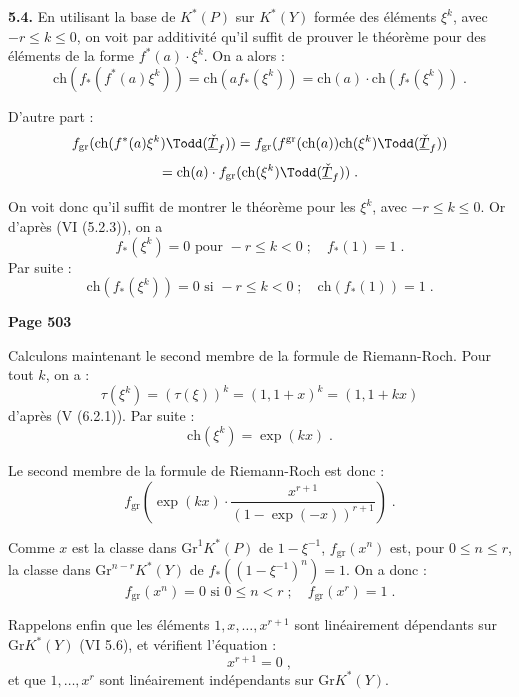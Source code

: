 \medskip
\noindent\textbf{5.4.} En utilisant la base de $K^*(P)$ sur $K^*(Y)$ form\'ee des \'el\'ements $\xi^k$, avec $-r \leq k \leq 0$, on voit par additivit\'e qu'il suffit de prouver le th\'eor\`eme pour des \'el\'ements de la forme $f^*(a) \cdot \xi^k$. On a alors :
\[
\mathrm{ch}(f_*(f^*(a)\xi^k)) = \mathrm{ch}(af_*(\xi^k)) = \mathrm{ch}(a) \cdot \mathrm{ch}(f_*(\xi^k))\;.
\]

D'autre part :
\[
f_{\mathrm{gr}}(\mathrm{ch}(f^*(a)\xi^k)\Todd(\underline{\check{T}}_f)) = f_{\mathrm{gr}}(f^{\mathrm{gr}}(\mathrm{ch}(a))\mathrm{ch}(\xi^k)\Todd(\underline{\check{T}}_f))
\]
\[
= \mathrm{ch}(a) \cdot f_{\mathrm{gr}}(\mathrm{ch}(\xi^k)\Todd(\underline{\check{T}}_f))\;.
\]

On voit donc qu'il suffit de montrer le th\'eor\`eme pour les $\xi^k$, avec $-r \leq k \leq 0$. Or d'apr\`es (VI (5.2.3)), on a
\[
f_*(\xi^k) = 0 \text{ pour } -r \leq k < 0\;;\quad f_*(1) = 1\;.
\]
Par suite :
\begin{equation}\tag{5.4.1}
\mathrm{ch}(f_*(\xi^k)) = 0 \text{ si } -r \leq k < 0\;;\quad \mathrm{ch}(f_*(1)) = 1\;.
\end{equation}

\newpage
\noindent\textbf{Page 503}

Calculons maintenant le second membre de la formule de Riemann-Roch. Pour tout $k$, on a :
\[
\tau(\xi^k) = (\tau(\xi))^k = (1, 1+x)^k = (1, 1+kx)
\]
d'apr\`es (V (6.2.1)). Par suite :
\begin{equation}\tag{5.4.2}
\mathrm{ch}(\xi^k) = \exp(kx)\;.
\end{equation}

Le second membre de la formule de Riemann-Roch est donc :
\begin{equation}\tag{5.4.3}
f_{\mathrm{gr}}(\exp(kx) \cdot \frac{x^{r+1}}{(1-\exp(-x))^{r+1}})\;.
\end{equation}

Comme $x$ est la classe dans $\mathrm{Gr}^1 K^*(P)$ de $1-\xi^{-1}$, $f_{\mathrm{gr}}(x^n)$ est, pour $0 \leq n \leq r$, la classe dans $\mathrm{Gr}^{n-r} K^*(Y)$ de $f_*((1-\xi^{-1})^n) = 1$. On a donc :
\begin{equation}\tag{5.4.4}
f_{\mathrm{gr}}(x^n) = 0 \text{ si } 0 \leq n < r\;;\quad f_{\mathrm{gr}}(x^r) = 1\;.
\end{equation}

Rappelons enfin que les \'el\'ements $1, x, \ldots, x^{r+1}$ sont lin\'eairement d\'ependants sur $\mathrm{Gr} K^*(Y)$ (VI 5.6), et v\'erifient l'\'equation :
\begin{equation}\tag{5.4.5}
x^{r+1} = 0\;,
\end{equation}
et que $1, \ldots, x^r$ sont lin\'eairement ind\'ependants sur $\mathrm{Gr} K^*(Y)$.

